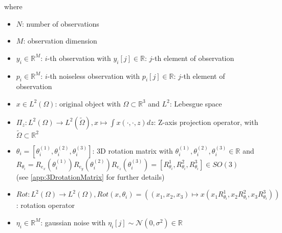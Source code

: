 where 
\begin{itemize}
    \item $N$: number of observations
    \item $M$: observation dimension
    \item $y_i \in \mathbb{R}^M$:  $i$-th observation with $y_i[j] \in \mathbb{R}$: $j$-th element of observation
    \item $p_i \in \mathbb{R}^M$:  $i$-th noiseless observation with $p_i[j] \in \mathbb{R}$: $j$-th element of observation
    \item $x \in L^2(\Omega)$: original object with $\Omega \subset \mathbb{R}^3 $ and $L^2$: Lebesgue space
    \item $\Pi_z : L^2(\Omega) \to L^2(\tilde{\Omega}), x \mapsto  \int x(\cdot,\cdot,z) dz$: Z-axis projection operator,
          with $\tilde{\Omega} \subset \mathbb{R}^2$
    \item $\theta_i = [\theta_i^{(1)}, \theta_i^{(2)}, \theta_i^{(3)} ] $: 3D rotation matrix with $ \theta_i^{(1)}, \theta_i^{(2)}, \theta_i^{(3)} \in \mathbb{R}$ and \\
          $R_{\theta_i} =  R_{e_x} (\theta_i^{(1)}) R_{e_y} (\theta_i^{(2)}) R_{e_z} (\theta_i^{(3)}) = [R^1_{\theta_i}, R^2_{\theta_i}, R^3_{\theta_i}] \in SO(3)$ \\
          (see \ref{app:3DrotationMatrix} for further details)
    \item $Rot : L^2(\Omega) \to L^2(\Omega), Rot(x, \theta_i) = \left((x_1,x_2,x_3) \mapsto x( x_1R^1_{\theta_i}, x_2R^2_{\theta_i}, x_3R^3_{\theta_i})\right)$: rotation operator
    \item $\eta_i \in \mathbb{R}^M$: gaussian noise with $\eta_i[j] \sim \mathcal{N}(0,\sigma^2) \in \mathbb{R}$
\end{itemize}




